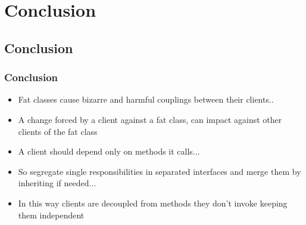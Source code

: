 \documentclass{beamer}
\begin{document}
\section{Conclusion}
\subsection{Conclusion}
\begin{frame}
  \frametitle{Conclusion}
  \begin{itemize}
	\item<+-> Fat classes cause bizarre and harmful couplings between their clients..
	\item<+-> A change forced by a client against a fat class, can impact against other clients of the fat class
	\item<+-> A client should depend only on methods it calls...
	\item<+-> So segregate single responsibilities in separated interfaces and merge them by inheriting if needed...
	\item<+-> In this way clients are decoupled from methods they don't invoke keeping them independent
   \end{itemize}
\end{frame}
\end{document}
